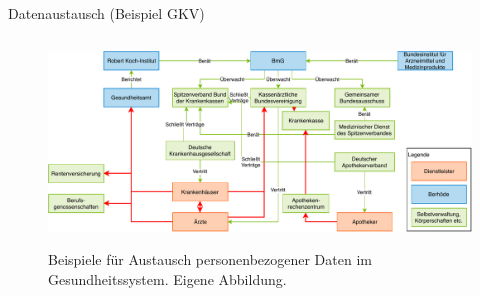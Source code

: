 \documentclass[aspectratio=169,t]{beamer}
\begin{document}
\begin{frame}{Datenaustausch (Beispiel GKV)}
    \begin{figure}[h!]
        \includegraphics[height=5.5cm, right]{Bilder/DatenfluesseGesundheitssystem.pdf}
        \caption{Beispiele für Austausch personenbezogener Daten im Gesundheitssystem. Eigene Abbildung.}
    \end{figure}
\end{frame}
\end{document}
